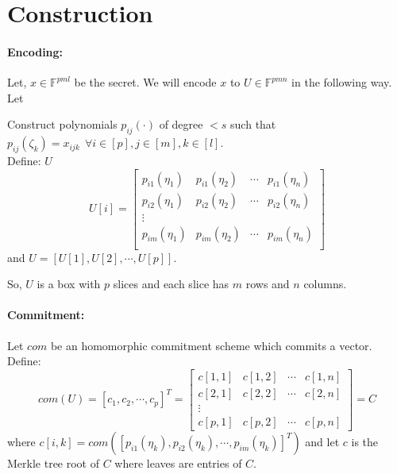\section{Construction}




\paragraph{Encoding:}
Let, $x\in \mathbb{F}^{pml}$ %
be the secret. We will encode $x$ to $U\in \mathbb{F}^{pmn}$ in the following way.\\
Let


Construct polynomials $p_{ij}(\cdot)$ %
of degree $< s$ such that 
$ p_{ij}(\zeta_k)=x_{ijk} ~~\forall i\in [p], j\in [m], k\in [l]$.\\
Define:  $U$ %
$$U[i]=
\begin{bmatrix}
	p_{i1}(\eta_1) & p_{i1}(\eta_2) & \cdots & p_{i1}(\eta_n)\\
	p_{i2}(\eta_1) & p_{i2}(\eta_2) & \cdots & p_{i2}(\eta_n)\\
	\vdots\\
	p_{im}(\eta_1) & p_{im}(\eta_2) & \cdots & p_{im}(\eta_n)\\
\end{bmatrix}
$$
and $U=[U[1], U[2], \cdots, U[p]]$.

So, $U$ is a box with $p$ slices and each slice has $m$ rows and $n$ columns.

\paragraph{Commitment:} Let $com$ be an homomorphic commitment scheme which commits a vector. Define:
$$com(U)= [c_1,c_2,\cdots , c_p]^T=
 \begin{bmatrix} 
c[1,1] & c[1,2] & \cdots & c[1,n] \\
c[2,1] & c[2,2] & \cdots & c[2,n] \\
\vdots\\
c[p,1] & c[p,2] & \cdots & c[p,n]
\end{bmatrix}
=C$$
where $c[i,k]=com([p_{i1}(\eta_k),p_{i2}(\eta_k),\cdots , p_{im}(\eta_k)]^T)$ and let $c$ is the Merkle tree root of $C$ where leaves are entries of $C$.

